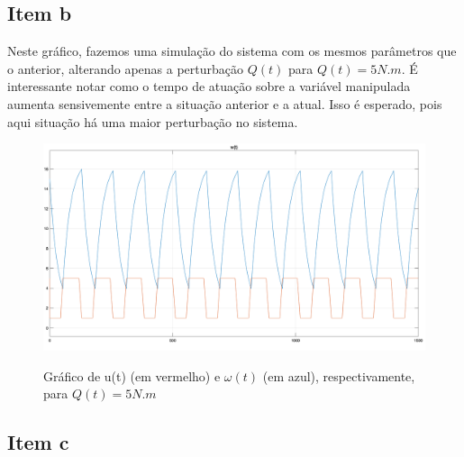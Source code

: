 \documentclass[11pt]{article}
\begin{document}
\subsection{Item b}

Neste gráfico, fazemos uma simulação do sistema com os mesmos parâmetros que o anterior, alterando apenas
a perturbação $Q(t)$ para $Q(t) = 5 N.m$. É interessante notar como o tempo de atuação sobre a variável manipulada
aumenta sensivemente entre a situação anterior e a atual. Isso é esperado, pois aqui situação há uma maior
perturbação no sistema.

\begin{figure}[H]
	\centering
	{\includegraphics[width=\textwidth]
		{assets/q4_b_plot.png}}
	\caption{Gráfico de u(t) (em vermelho) e $\omega(t)$ (em azul), respectivamente, para $Q(t) = 5 N.m$}
\end{figure}

\subsection{Item c}
\end{document}
